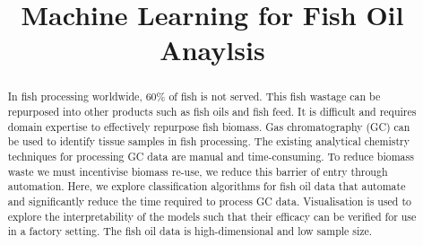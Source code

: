 \documentclass[runningheads]{llncs}
\begin{document}
%
\title{Machine Learning for Fish Oil Anaylsis}
%
%
%

%
\maketitle              %
%
\begin{abstract}
  
  In fish processing worldwide, 60\% of fish is not served. 
  This fish wastage can be repurposed into other products such as fish oils and fish feed.
  It is difficult and requires domain expertise to effectively repurpose fish biomass.
  Gas chromatography (GC) can be used to identify tissue samples in fish processing.
  The existing analytical chemistry techniques for processing GC data are manual and time-consuming.
  To reduce biomass waste we must incentivise biomass re-use, we reduce this barrier of entry through automation. 
  Here, we explore classification algorithms for fish oil data that automate and significantly reduce the time required to process GC data.
  Visualisation is used to explore the interpretability of the models such that their efficacy can be verified for use in a factory setting.
  The fish oil data is high-dimensional and low sample size.
  
\end{abstract}
\end{document}
